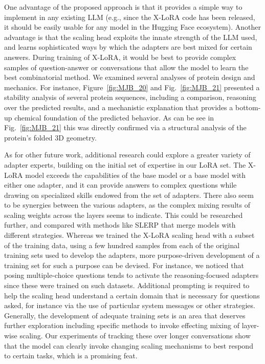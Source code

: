 \documentclass{article}
\begin{document}
One advantage of the  proposed approach is that it provides a simple way to implement in any existing LLM (e.g., since the X-LoRA code has been released, it should be easily usable for any model in the Hugging Face ecosystem). Another advantage is that the scaling head exploits the innate strength of the LLM used, and learns sophisticated ways by which the adapters are best mixed for certain answers. During training of X-LoRA, it would be best to provide complex samples of question-answer or conversations that allow the model to learn the best combinatorial method. We examined several analyses of protein design and mechanics. For instance, Figure~\ref{fig:MJB_20} and Fig.~\ref{fig:MJB_21} presented a stability analysis of several protein sequences, including a comparison, reasoning over the predicted results, and a mechanistic explanation that provides a bottom-up chemical foundation of the predicted behavior. As can be see in Fig.~\ref{fig:MJB_21} this was directly confirmed via a structural analysis of the protein's folded 3D geometry. 


As for other future work, additional research could explore a greater variety of adapter experts, building on the initial set of expertise in our LoRA set. The X-LoRA model exceeds the capabilities of the base model or a base model with either one adapter, and it can provide answers to complex questions while drawing on specialized skills endowed from the set of adapters. There also seem to be synergies between the various adapters, as the complex mixing results of scaling weights across the layers seems to indicate. This could be researched further, and compared with methods like SLERP that merge models with different strategies. Whereas we trained the X-LoRA scaling head with a subset of the training data, using a few hundred samples from each of the original training sets used to develop the adapters, more purpose-driven development of a training set for such a purpose can be devised. For instance, we noticed that posing multiple-choice questions tends to activate the reasoning-focused adapters since these were trained on such datasets. Additional prompting is required to help the scaling head understand a certain domain that is necessary for questions asked, for instance via the use of particular system messages or other strategies. Generally, the development of adequate training sets is an area that deserves further exploration including specific methods to invoke effecting mixing of layer-wise scaling. Our experiments of tracking these over longer conversations show that the model can clearly invoke changing scaling mechanisms to best respond to certain tasks, which is a promising feat. 
\end{document}

